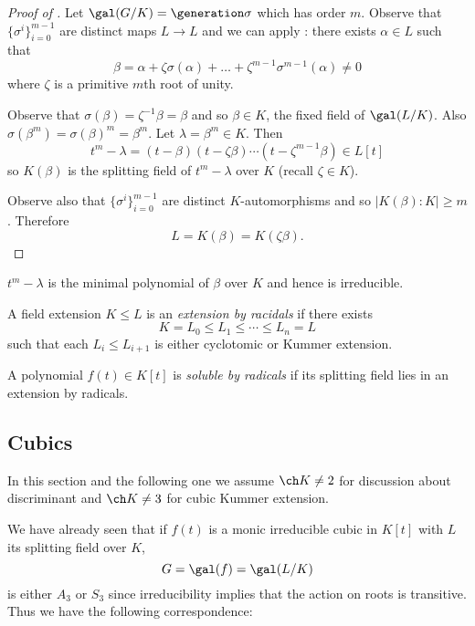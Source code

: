 \documentclass[a4paper]{article}
\begin{document}
\begin{proof}[Proof of ]
  \label{proof:kummer theory}
  Let \(\gal(G/K) = \generation \sigma\) which has order \(m\). Observe that \(\{\sigma^i\}_{i = 0}^{m - 1}\) are distinct maps \(L \to L\) and we can apply : there exists \(\alpha \in L\) such that
  \[
    \beta = \alpha + \zeta \sigma(\alpha) + \dots + \zeta^{m - 1} \sigma^{m - 1}(\alpha) \neq 0
  \]
  where \(\zeta\) is a primitive \(m\)th root of unity.

  Observe that \(\sigma(\beta) = \zeta^{-1} \beta = \beta\) and so \(\beta \in K\), the fixed field of \(\gal(L/K)\). Also \(\sigma(\beta^m) = \sigma(\beta)^m = \beta^m\). Let \(\lambda = \beta^m \in K\). Then
  \[
    t^m - \lambda = (t - \beta)(t - \zeta\beta)\cdots(t - \zeta^{m - 1}\beta) \in L[t]
  \]
  so \(K(\beta)\) is the splitting field of \(t^m - \lambda\) over \(K\) (recall \(\zeta \in K\)).

  Observe also that \(\{\sigma^i\}_{i = 0}^{m - 1}\) are distinct \(K\)-automorphisms and so \(|K(\beta):K| \geq m\). Therefore
  \[
    L = K(\beta) = K(\zeta\beta).
  \]
\end{proof}

\(t^m - \lambda\) is the minimal polynomial of \(\beta\) over \(K\) and hence is irreducible.

\begin{definition}
  A field extension \(K \leq L\) is an \emph{extension by racidals} if there exists
  \[
    K = L_0 \leq L_ 1 \leq \cdots \leq L_n = L
  \]
  such that each \(L_i \leq L_{i + 1}\) is either cyclotomic or Kummer extension.
\end{definition}

\begin{definition}
  A polynomial \(f(t) \in K[t]\) is \emph{soluble by radicals} if its splitting field lies in an extension by radicals.
\end{definition}

\subsection{Cubics}

In this section and the following one we assume \(\ch K \neq 2\) for discussion about discriminant and \(\ch K \neq 3\) for cubic Kummer extension.

We have already seen that if \(f(t)\) is a monic irreducible cubic in \(K[t]\) with \(L\) its splitting field over \(K\),
\[
  G = \gal(f) = \gal(L/K)
\]
is either \(A_3\) or \(S_3\) since irreducibility implies that the action on roots is transitive. Thus we have the following correspondence:
\end{document}
